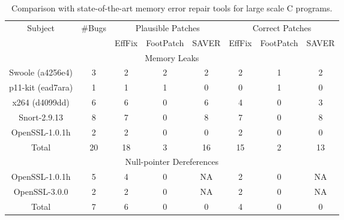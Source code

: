 \begin{table}[t]
\scriptsize
\centering
\renewcommand{\arraystretch}{1.2}
\setlength{\tabcolsep}{2pt}
\caption{Comparison with state-of-the-art memory error repair tools for large scale C programs.}
\label{tab:comparison}
\begin{tabular}{c|c|ccc|ccc}
\hline
\multirow{2}{*}{Subject} & \multirow{2}{*}{\#Bugs} & \multicolumn{3}{c|}{Plausible Patches} & \multicolumn{3}{c}{Correct Patches} \\ 
\cline{3-8}
 &  & \multicolumn{1}{c|}{EffFix} & \multicolumn{1}{c|}{FootPatch} & SAVER & \multicolumn{1}{c|}{EffFix} & \multicolumn{1}{c|}{FootPatch} & SAVER \\ \hline
\multicolumn{8}{c}{Memory Leaks} \\ \hline

Swoole (a4256e4) & 3 & \multicolumn{1}{c|}{2} & \multicolumn{1}{c|}{2} & 2 & \multicolumn{1}{c|}{2} & \multicolumn{1}{c|}{1} & 2 \\ \hline


p11-kit (ead7ara) & 1 & \multicolumn{1}{c|}{1} & \multicolumn{1}{c|}{1} & 0 & \multicolumn{1}{c|}{0} & \multicolumn{1}{c|}{1} & 0 \\ \hline


x264 (d4099dd) & 6 & \multicolumn{1}{c|}{6} & \multicolumn{1}{c|}{0} & 6 & \multicolumn{1}{c|}{4} & \multicolumn{1}{c|}{0} & 3 \\ \hline


Snort-2.9.13 & 8 & \multicolumn{1}{c|}{7} & \multicolumn{1}{c|}{0} & 8 & \multicolumn{1}{c|}{7} & \multicolumn{1}{c|}{0} & 8 \\ \hline


OpenSSL-1.0.1h & 2 & \multicolumn{1}{c|}{2} & \multicolumn{1}{c|}{0} & 0 & \multicolumn{1}{c|}{2} & \multicolumn{1}{c|}{0} & 0 \\ \hline


Total & 20 & \multicolumn{1}{c|}{18} & \multicolumn{1}{c|}{3} & 16 & \multicolumn{1}{c|}{15} & \multicolumn{1}{c|}{2} & 13 \\ \hline

\multicolumn{8}{c}{Null-pointer Dereferences} \\ \hline
OpenSSL-1.0.1h & 5 & \multicolumn{1}{c|}{4} & \multicolumn{1}{c|}{0} & NA & \multicolumn{1}{c|}{2} & \multicolumn{1}{c|}{0} & NA \\ \hline


OpenSSL-3.0.0  & 2 & \multicolumn{1}{c|}{2} & \multicolumn{1}{c|}{0} & NA & \multicolumn{1}{c|}{2} & \multicolumn{1}{c|}{0} & NA \\ \hline


Total & 7 & \multicolumn{1}{c|}{6} & \multicolumn{1}{c|}{0} & 0 & \multicolumn{1}{c|}{4} & \multicolumn{1}{c|}{0} & 0 \\ \hline

\end{tabular}%
\end{table}